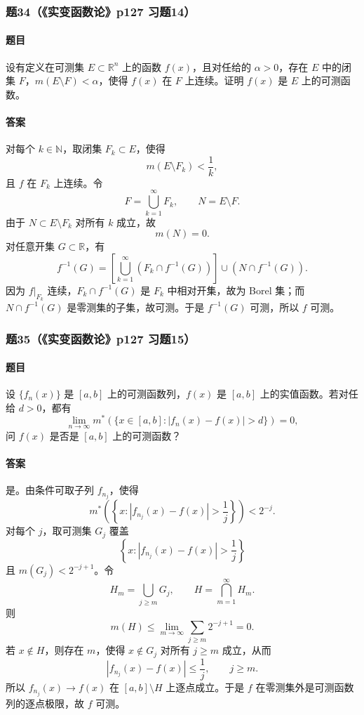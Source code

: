 \documentclass{article}
\newcommand{\R}{\mathbb{R}}
\newcommand{\N}{\mathbb{N}}
\newcommand{\meas}{m}
\newcommand{\mouter}{m^*}
\begin{document}
\subsubsection*{题34（《实变函数论》p127 习题14）}
\paragraph{题目}设有定义在可测集 $E\subset\R^n$ 上的函数 $f(x)$，且对任给的 $\alpha>0$，存在 $E$ 中的闭集 $F$，$\meas(E\setminus F)<\alpha$，使得 $f(x)$ 在 $F$ 上连续。证明 $f(x)$ 是 $E$ 上的可测函数。

\paragraph{答案}对每个 $k\in\N$，取闭集 $F_k\subset E$，使得
\[
\meas(E\setminus F_k)<\frac1k,
\]
且 $f$ 在 $F_k$ 上连续。令
\[
F=\bigcup_{k=1}^{\infty}F_k,
\qquad
N=E\setminus F.
\]
由于 $N\subset E\setminus F_k$ 对所有 $k$ 成立，故
\[
\meas(N)=0.
\]
对任意开集 $G\subset\R$，有
\[
f^{-1}(G)=\left[\bigcup_{k=1}^{\infty}(F_k\cap f^{-1}(G))\right]\cup(N\cap f^{-1}(G)).
\]
因为 $f|_{F_k}$ 连续，$F_k\cap f^{-1}(G)$ 是 $F_k$ 中相对开集，故为 Borel 集；而 $N\cap f^{-1}(G)$ 是零测集的子集，故可测。于是 $f^{-1}(G)$ 可测，所以 $f$ 可测。

\subsubsection*{题35（《实变函数论》p127 习题15）}
\paragraph{题目}设 $\{f_n(x)\}$ 是 $[a,b]$ 上的可测函数列，$f(x)$ 是 $[a,b]$ 上的实值函数。若对任给 $d>0$，都有
\[
\lim_{n\to\infty}\mouter\left(\{x\in[a,b]:|f_n(x)-f(x)|>d\}\right)=0,
\]
问 $f(x)$ 是否是 $[a,b]$ 上的可测函数？

\paragraph{答案}是。由条件可取子列 $f_{n_j}$，使得
\[
\mouter\left(\left\{x:|f_{n_j}(x)-f(x)|>\frac1j\right\}\right)<2^{-j}.
\]
对每个 $j$，取可测集 $G_j$ 覆盖
\[
\left\{x:|f_{n_j}(x)-f(x)|>\frac1j\right\}
\]
且 $\meas(G_j)<2^{-j+1}$。令
\[
H_m=\bigcup_{j\ge m}G_j,
\qquad
H=\bigcap_{m=1}^{\infty}H_m.
\]
则
\[
\meas(H)\le \lim_{m\to\infty}\sum_{j\ge m}2^{-j+1}=0.
\]
若 $x\notin H$，则存在 $m$，使得 $x\notin G_j$ 对所有 $j\ge m$ 成立，从而
\[
|f_{n_j}(x)-f(x)|\le\frac1j,
\qquad j\ge m.
\]
所以 $f_{n_j}(x)\to f(x)$ 在 $[a,b]\setminus H$ 上逐点成立。于是 $f$ 在零测集外是可测函数列的逐点极限，故 $f$ 可测。
\end{document}
